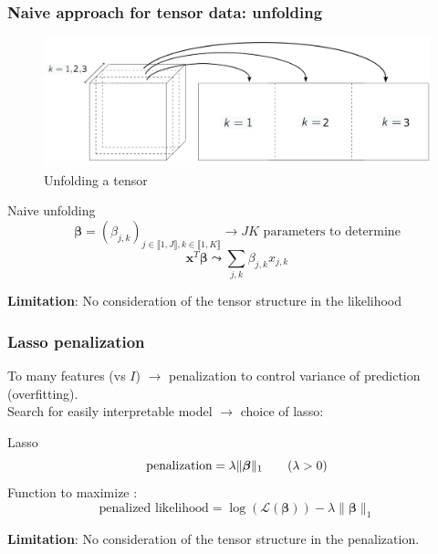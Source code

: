 \documentclass{beamer}
\begin{document}
\begin{frame}
    \frametitle{Naive approach for tensor data: unfolding}
    \begin{figure}
        \centering
        \includegraphics[scale = 0.15]{images/deplier.png}
        \caption{Unfolding a tensor}
    \end{figure}
    \begin{block}{Naive unfolding}
    $$\bm{\beta} = (\beta_{j,k})_{j \in \llbracket 1, J\rrbracket, k \in \llbracket 1, K\rrbracket} \rightarrow JK\text{ parameters to determine}$$ 
    $$\mathbf{x}^T \bm{\beta} \leadsto \sum\limits_{j,k}  \beta_{j,k} x_{j,k}$$
    \end{block}
    \textbf{Limitation}: No consideration of the tensor structure in the likelihood
    
    
\end{frame}

\begin{frame}
    \frametitle{Lasso penalization}
    To many features (vs $I$) $\rightarrow$ penalization to control variance of prediction (overfitting).\\[10 pt]
    Search for easily interpretable model $\rightarrow$ choice of lasso: 
    \begin{block}{Lasso}
    $$\text{penalization} = \lambda \lVert \bm{\beta} \rVert_1 \hspace{0.7 cm} (\lambda >0)$$
    Function to maximize : 
    $$ \text{penalized likelihood} =  \log(\mathcal{L}(\bm{\beta})) - \lambda \lVert \bm{\beta} \rVert_1 $$
    \end{block}
\vspace{5 pt}
    \textbf{Limitation}: No consideration of the tensor structure in the penalization.

    
\end{frame}


\end{document}
